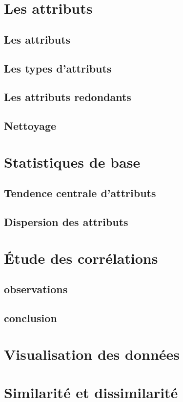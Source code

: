 \documentclass[12pt]{extarticle}
\begin{document}
\section{Les attributs}

\subsection{Les attributs}

\subsection{Les types d’attributs}

\subsection{Les attributs redondants}

\subsection{Nettoyage}

\section{Statistiques de base}

\subsection{Tendence centrale d’attributs}

\subsection{Dispersion des attributs}


\section{Étude des corrélations}


\subsection{observations}

\subsection{conclusion}


\section{Visualisation des données}



\section{Similarité et dissimilarité}

 
\end{document}
